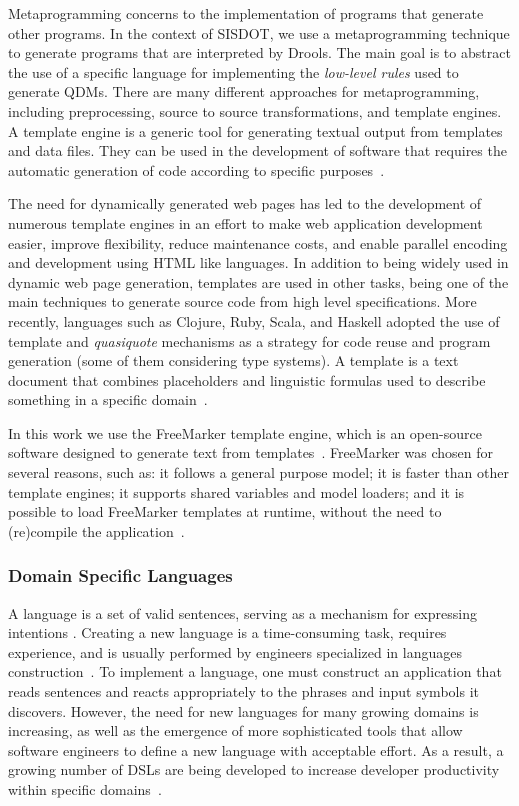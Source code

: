 Metaprogramming concerns to the implementation of programs that generate other programs. In the context of SISDOT, we use a metaprogramming technique to generate programs that are interpreted by Drools. The main goal is to abstract the use of a specific language for implementing the \emph{low-level rules} used to generate QDMs. There are many different approaches for metaprogramming, including preprocessing, source to source transformations, and template engines. A template engine is a generic tool for generating textual output from templates and data files. They can be used in the development of software that requires the automatic generation of code according to specific purposes~\cite{benato2017}. 

The need for dynamically generated web pages has led to the development of numerous template engines in an effort to make web application development easier, improve flexibility, reduce maintenance costs, and enable parallel encoding and development using HTML like languages. In addition to being widely used in dynamic web page generation, templates are used in other tasks, being one of the main techniques to generate source code from high level specifications. More recently, languages such as Clojure, Ruby, Scala, and Haskell adopted the use of template and \emph{quasiquote} mechanisms as a strategy for code reuse and program generation (some of them considering type systems). A template is a text document that combines placeholders and linguistic formulas used to describe something in a specific domain~\cite{segura2017}. 

In this work we use the FreeMarker template engine, which is an open-source software designed to generate text from templates~\cite{radjenovic2009}. FreeMarker was chosen for several reasons, such as: it follows a general purpose model; it is faster than other template engines; it supports shared variables and model loaders; and it is possible to load FreeMarker templates at runtime, without the need to (re)compile the application~\cite{benato2017,parr2006}.


\subsubsection{Domain Specific Languages}

A language is a set of valid sentences, serving as a mechanism for expressing intentions \cite{parr2010}. Creating a new language is a time-consuming task, requires experience, and is usually performed by engineers specialized in languages construction~\cite{karsai2014}. To implement a language, one must construct an application that reads sentences and reacts appropriately to the phrases and input symbols it discovers. However, the need for new languages for many growing domains is increasing, as well as the emergence of more sophisticated tools that allow software engineers to define a new language with acceptable effort. As a result, a growing number of DSLs are being developed to increase developer productivity within specific domains~\cite{karsai2014}. 



